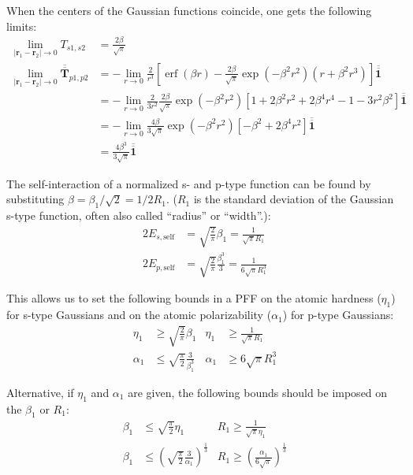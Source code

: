 \documentclass[a4paper,12pt,parskip=half]{scrartcl}
\newcommand*{\tensor}[1]{\overline{\overline{\mathbold{#1}}}}
\DeclareMathOperator{\erf}{erf}
\begin{document}
When the centers of the Gaussian functions coincide, one gets the following limits:
%
\begin{align}
    \lim_{|\mathbold{r}_1 - \mathbold{r}_2| \rightarrow 0} T_{s1,s2} &= \frac{2 \beta}{\sqrt{\pi}} \\
    \lim_{|\mathbold{r}_1 - \mathbold{r}_2| \rightarrow 0} \tensor{T}_{p1,p2}
        &= -\lim_{r\rightarrow 0} \frac{2}{r^3} \left[
            \erf(\beta r) - \frac{2\beta}{\sqrt{\pi}} \exp(-\beta^2 r^2) (r + \beta^2 r^3)
           \right] \tensor{1} \\
        &= -\lim_{r\rightarrow 0} \frac{2}{3r^2} \frac{2\beta}{\sqrt{\pi}} \exp(-\beta^2 r^2) \left[
            1
            + 2\beta^2 r^2 + 2 \beta^4 r^4
            - 1 - 3r^2\beta^2
           \right] \tensor{1} \\
        &= -\lim_{r\rightarrow 0} \frac{4\beta}{3\sqrt{\pi}} \exp(-\beta^2 r^2) \left[
            -\beta^2 + 2\beta^4 r^2
           \right] \tensor{1} \\
        &= \frac{4 \beta^3}{3 \sqrt{\pi}} \tensor{1}
\end{align}

The self-interaction of a normalized s- and p-type function can be found by substituting $\beta = \beta_1 / \sqrt{2} = 1/2R_1$. ($R_1$ is the standard deviation of the Gaussian s-type function, often also called ``radius'' or ``width''.):
%
\begin{align}
    \label{eq:ss_limit}
    2 E_{s,\text{self}} &= \sqrt{\frac{2}{\pi}} \beta_1 = \frac{1}{\sqrt{\pi}R_1} \\
    \label{eq:pp_limit}
    2 E_{p,\text{self}} &= \sqrt{\frac{2}{\pi}} \frac{\beta_1^3}{3} = \frac{1}{6\sqrt{\pi}R_1^3}
\end{align}

This allows us to set the following bounds in a PFF on the atomic hardness ($\eta_1$) for s-type Gaussians and on the atomic polarizability ($\alpha_1$) for p-type Gaussians:
%
\begin{align}
    \eta_1 &\ge \sqrt{\frac{2}{\pi}} \beta_1
        & \eta_1 &\ge \frac{1}{\sqrt{\pi} R_1} \\
    \alpha_1 &\le \sqrt{\frac{\pi}{2}} \frac{3}{\beta_1^3}
        & \alpha_1 &\ge 6\sqrt{\pi} R_1^3
\end{align}

Alternative, if $\eta_1$ and $\alpha_1$ are given, the following bounds should be imposed on the $\beta_1$ or $R_1$:
%
\begin{align}
    \beta_1 &\le \sqrt{\frac{\pi}{2}} \eta_1
        & R_1 \ge \frac{1}{\sqrt{\pi} \eta_1} \\
    \label{eq:bound_radii_pp}
    \beta_1 &\le \left(\sqrt{\frac{\pi}{2}} \frac{3}{\alpha_1}\right)^{\frac{1}{3}}
        & R_1 \ge \left(\frac{\alpha_1}{6 \sqrt{\pi}}\right)^{\frac{1}{3}}
\end{align}
\end{document}
